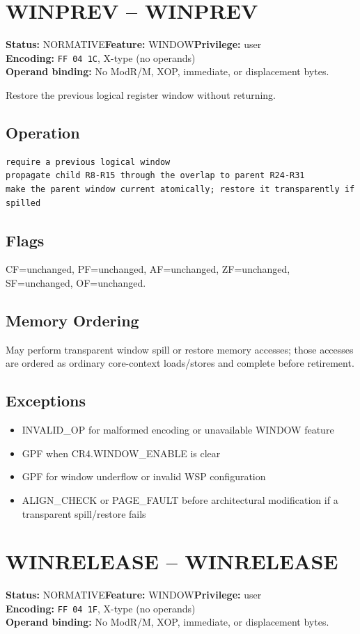 \documentclass[10pt]{article}
\begin{document}
\section{WINPREV -- WINPREV}
\textbf{Status:} NORMATIVE\quad \textbf{Feature:} WINDOW\quad \textbf{Privilege:} user\\
\textbf{Encoding:} \texttt{FF 04 1C}, X-type (no operands)\\
\textbf{Operand binding:} No ModR/M, XOP, immediate, or displacement bytes.

Restore the previous logical register window without returning.

\subsection*{Operation}
\begin{lstlisting}
require a previous logical window
propagate child R8-R15 through the overlap to parent R24-R31
make the parent window current atomically; restore it transparently if spilled
\end{lstlisting}
\subsection*{Flags}
CF=unchanged, PF=unchanged, AF=unchanged, ZF=unchanged, SF=unchanged, OF=unchanged.
\subsection*{Memory Ordering}
May perform transparent window spill or restore memory accesses; those accesses are ordered as ordinary core-context loads/stores and complete before retirement.
\subsection*{Exceptions}
\begin{itemize}
\item INVALID\_OP for malformed encoding or unavailable WINDOW feature
\item GPF when CR4.WINDOW\_ENABLE is clear
\item GPF for window underflow or invalid WSP configuration
\item ALIGN\_CHECK or PAGE\_FAULT before architectural modification if a transparent spill/restore fails
\end{itemize}
\clearpage

\section{WINRELEASE -- WINRELEASE}
\textbf{Status:} NORMATIVE\quad \textbf{Feature:} WINDOW\quad \textbf{Privilege:} user\\
\textbf{Encoding:} \texttt{FF 04 1F}, X-type (no operands)\\
\textbf{Operand binding:} No ModR/M, XOP, immediate, or displacement bytes.
\end{document}
